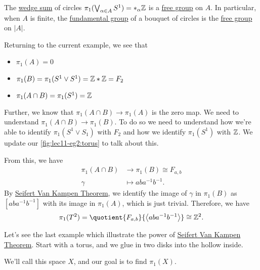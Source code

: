 \begin{explanation}
	\begin{corollary}
		The \hyperref[CW-complex-wedge-sum]{wedge sum} of circles \(\pi _1(\bigvee_{\alpha \in A}S^1) = \ast_\alpha \mathbb{\MakeUppercase{z}} \) is a \hyperref[def:free-group]{free group} on \(A\).
		In particular, when \(A\) is finite, the \hyperref[def:fundamental-group]{fundamental group} of a bouquet of circles is the \hyperref[def:free-group]{free group}
		on \(\left\vert A \right\vert \).
	\end{corollary}

	Returning to the current example, we see that
	\begin{itemize}
		\item \(\pi _1(A) = 0\)
		\item \(\pi _1(B) = \pi _1(S^1\vee S^1) = \mathbb{\MakeUppercase{z}} \ast \mathbb{\MakeUppercase{z}}  = F_2\)
		\item \(\pi _1(A\cap B) = \pi _1(S^1) = \mathbb{\MakeUppercase{z}} \)
	\end{itemize}

	Further, we know that \(\pi _1(A\cap B)\to \pi _1(A)\) is the zero map. We need to understand \(\pi_1(A\cap B)\to \pi _1(B)\). To do so we
	need to understand how we're able to identify \(\pi _1(S^1\vee S_1)\) with \(F_2\) and how we identify \(\pi _1(S^1)\) with \(\mathbb{\MakeUppercase{z}} \).
	We update our \autoref{fig:lec11-eg2:torus} to talk about this.
	\begin{figure}[H]
		\centering
		\label{fig:lec11-eg2:torus-ver2}
	\end{figure}
	From this, we have
	\[
		\begin{split}
			\pi _1(A\cap B) &\to \pi _1(B)\cong F_{a, b}\\
			\gamma &\mapsto aba^{-1} b^{-1}.
		\end{split}
	\]
	By \hyperref[thm:Seifert-Van-Kampen-Theorem]{Seifert Van Kampen Theorem}, we identify the image of \(\gamma \) in \(\pi _1(B)\) as \([aba^{-1} b^{-1} ]\) with
	its image in \(\pi _1(A)\), which is just trivial. Therefore, we have
	\[
		\pi _1(T^2) = \quotient{F_{a, b}}{\left< aba^{-1} b^{-1}  \right> } \cong \mathbb{\MakeUppercase{z}} ^2.
	\]
\end{explanation}
\begin{eg}
	Let's see the last example which illustrate the power of \hyperref[thm:Seifert-Van-Kampen-Theorem]{Seifert Van Kampen Theorem}. Start with a torus, and
	we glue in two disks into the hollow inside.
	\begin{figure}[H]
		\centering
		\label{fig:lec11:eg-3:1}
	\end{figure}
	We'll call this space \(X\), and our goal is to find \(\pi_1(X)\).
\end{eg}
